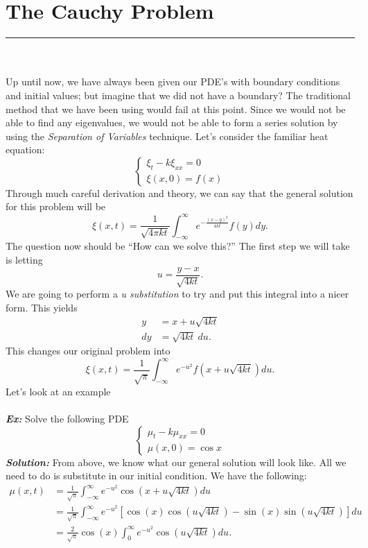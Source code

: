 \documentclass{article}
\begin{document}
\section{The Cauchy Problem}
\hrule
\noindent \\\\
\indent Up until now, we have always been given our PDE's with boundary conditions and initial values; but imagine that we did not have a boundary? The traditional method that we have been using would fail at this point. Since we would not be able to find any eigenvalues, we would not be able to form a series solution by using the \textit{Separation of Variables} technique. Let's consider the familiar heat equation:
\[
\begin{cases}
\xi_{t} - k\xi_{xx} = 0\\
\xi(x,0) = f(x)
\end{cases}
\]
Through much careful derivation and theory, we can say that the general solution for this problem will be
\[
\xi(x,t) = \frac{1}{\sqrt{4 \pi k t}}\int_{-\infty}^{\infty}e^{-\frac{(x-y)^{2}}{4kt}}f(y)dy.
\]
The question now should be ``How can we solve this?'' The first step we will take is letting
\[
u = \frac{y-x}{\sqrt{4kt}}.
\]
We are going to perform a \textit{u substitution} to try and put this integral into a nicer form. This yields
\begin{align*}
y &= x + u\sqrt{4kt}\\
dy &= \sqrt{4kt}\ du.
\end{align*}
This changes our original problem into
\[
\xi(x,t) = \frac{1}{\sqrt{\pi}}\int_{-\infty}^{\infty}e^{-u^{2}}f(x+u\sqrt{4kt})du.
\]
Let's look at an example\\\\
\noindent \textbf{\textit{Ex:}} Solve the following PDE
\[
\begin{cases}
\mu_{t} - k\mu_{xx} = 0\\
\mu(x,0) = \cos{x}
\end{cases}
\]
\indent \textbf{\textit{Solution:}} From above, we know what our general solution will look like. All we need to do is substitute in our initial condition. We have the following:
\begin{align*}
\mu(x,t) &= \frac{1}{\sqrt{\pi}}\int_{-\infty}^{\infty}e^{-u^{2}}\cos{(x + u\sqrt{4kt})}du\\
&= \frac{1}{\sqrt{\pi}}\int_{-\infty}^{\infty}e^{-u^{2}}\left[\cos{(x)}\cos{(u\sqrt{4kt})} - \sin{(x)}\sin{(u\sqrt{4kt})}\right]du\\
&=  \frac{2}{\sqrt{\pi}}\cos{(x)}\int_{0}^{\infty}e^{-u^{2}}\cos{(u\sqrt{4kt})}du.
\end{align*}
\end{document}
